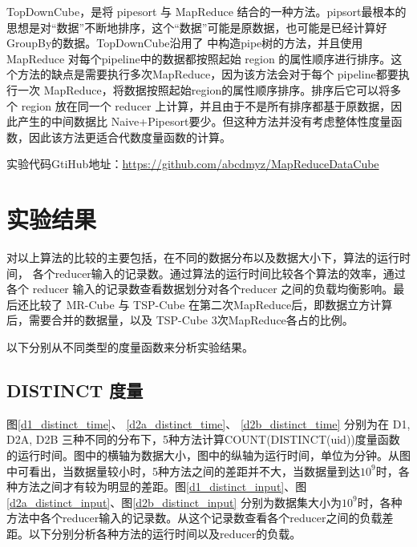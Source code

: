 TopDownCube，是将 pipesort 与 MapReduce 结合的一种方法。pipsort最根本的思想是对``数据”不断地排序，这个``数据”可能是原数据，也可能是已经计算好GroupBy的数据。TopDownCube沿用了\cite{agarwal1996computation} 中构造pipe树的方法，并且使用 MapReduce 对每个pipeline中的数据都按照起始 region 的属性顺序进行排序。这个方法的缺点是需要执行多次MapReduce，因为该方法会对于每个 pipeline都要执行一次 MapReduce，将数据按照起始region的属性顺序排序。排序后它可以将多个 region 放在同一个 reducer 上计算，并且由于不是所有排序都基于原数据，因此产生的中间数据比 Naive+Pipesort要少。但这种方法并没有考虑整体性度量函数，因此该方法更适合代数度量函数的计算。

实验代码GtiHub地址：\url{https://github.com/abcdmyz/MapReduceDataCube}

\section{实验结果}

对以上算法的比较的主要包括，在不同的数据分布以及数据大小下，算法的运行时间， 各个reducer输入的记录数。通过算法的运行时间比较各个算法的效率，通过各个 reducer 输入的记录数查看数据划分对各个reducer 之间的负载均衡影响。最后还比较了 MR-Cube 与 TSP-Cube 在第二次MapReduce后，即数据立方计算后，需要合并的数据量，以及 TSP-Cube 3次MapReduce各占的比例。

以下分别从不同类型的度量函数来分析实验结果。

\subsection{DISTINCT 度量}


图\ref{d1_distinct_time}、 \ref{d2a_distinct_time}、 \ref{d2b_distinct_time} 分别为在 D1, D2A, D2B 三种不同的分布下，5种方法计算COUNT(DISTINCT(uid))度量函数的运行时间。图中的横轴为数据大小，图中的纵轴为运行时间，单位为分钟。从图中可看出，当数据量较小时，5种方法之间的差距并不大，当数据量到达${10}^{9}$时，各种方法之间才有较为明显的差距。图\ref{d1_distinct_input}、图\ref{d2a_distinct_input}、图\ref{d2b_distinct_input} 分别为数据集大小为${10}^{9}$时，各种方法中各个reducer输入的记录数。从这个记录数查看各个reducer之间的负载差距。以下分别分析各种方法的运行时间以及reducer的负载。

